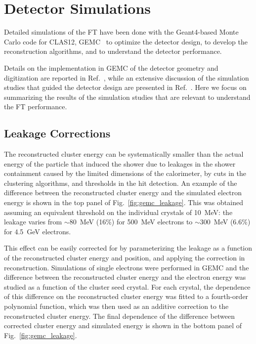 \section{Detector Simulations}

Detailed simulations of the FT have been done with the Geant4-based Monte Carlo code for CLAS12,
GEMC~\cite{gemc} to optimize the detector design, to develop the reconstruction algorithms, and to understand
the detector performance.

Details on the implementation in GEMC of the detector geometry and digitization are reported in Ref.~\cite{gemc},
while an extensive discussion of the simulation studies that guided the detector design are presented in
Ref.~\cite{ft-tdr}. Here we focus on summarizing the results of the simulation studies that are relevant to
understand the FT performance.

\subsection{Leakage Corrections}

The reconstructed cluster energy can be systematically smaller than the actual energy of the particle that
induced the shower due to leakages in the shower containment caused by the limited dimensions of the
calorimeter, by cuts in the clustering algorithms, and thresholds in the hit detection. An example of the difference
between the reconstructed cluster energy and the simulated electron energy is shown in the top panel of
Fig.~\ref{fig:gemc_leakage}. This was obtained assuming an equivalent threshold on  the individual crystals of
10~MeV: the leakage varies from $\sim$80~MeV (16\%) for 500~MeV electrons to $\sim$300~MeV (6.6\%) for
4.5~GeV electrons.

This effect can be easily corrected for by parameterizing the leakage as a function of the reconstructed cluster
energy and position, and applying the correction in reconstruction. Simulations of single electrons were performed
in GEMC and the difference between the reconstructed cluster energy and the electron energy was studied as a
function of the cluster seed crystal. For each crystal, the dependence of this difference on the reconstructed
cluster energy was fitted to a fourth-order polynomial function, which was then used as an additive correction to
the reconstructed cluster energy. The final dependence of the difference between corrected cluster energy and
simulated energy is shown in the bottom panel of Fig.~\ref{fig:gemc_leakage}.

